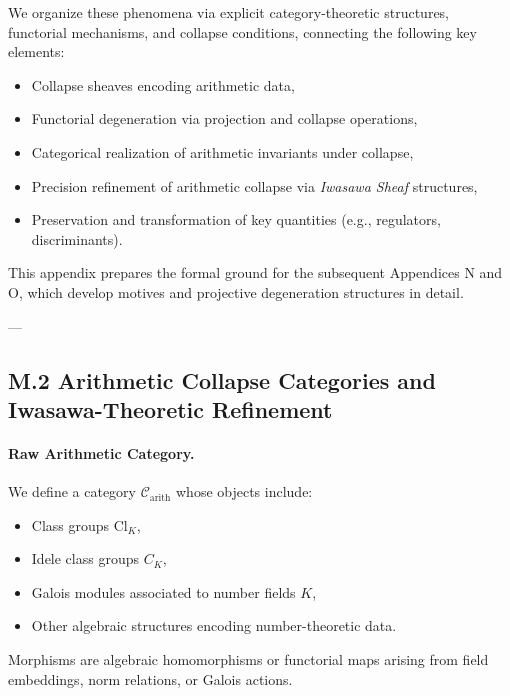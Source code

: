 \documentclass[11pt]{article}
\begin{document}
We organize these phenomena via explicit category-theoretic structures, functorial mechanisms, and collapse conditions, connecting the following key elements:
\begin{itemize}
  \item Collapse sheaves encoding arithmetic data,
  \item Functorial degeneration via projection and collapse operations,
  \item Categorical realization of arithmetic invariants under collapse,
  \item Precision refinement of arithmetic collapse via \emph{Iwasawa Sheaf} structures,
  \item Preservation and transformation of key quantities (e.g., regulators, discriminants).
\end{itemize}

This appendix prepares the formal ground for the subsequent Appendices N and O, which develop motives and projective degeneration structures in detail.

---

\subsection*{M.2 Arithmetic Collapse Categories and Iwasawa-Theoretic Refinement}

\paragraph{Raw Arithmetic Category.}
We define a category \( \mathcal{C}_{\mathrm{arith}} \) whose objects include:
\begin{itemize}
  \item Class groups \( \mathrm{Cl}_K \),
  \item Idele class groups \( C_K \),
  \item Galois modules associated to number fields \( K \),
  \item Other algebraic structures encoding number-theoretic data.
\end{itemize}

Morphisms are algebraic homomorphisms or functorial maps arising from field embeddings, norm relations, or Galois actions.
\end{document}

